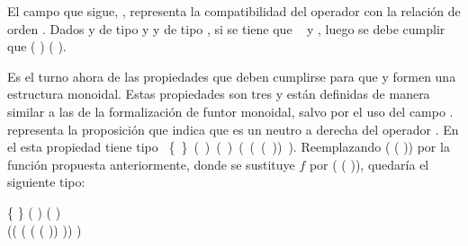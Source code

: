 El campo que sigue, , representa la compatibilidad del operador  con la relación de orden . Dados  y  de tipo  y  y  de tipo , si se tiene que \hbox{  } y   , luego se debe cumplir que ( )  ( ). 

Es el turno ahora de las propiedades que deben cumplirse para que  y  formen una estructura monoidal. Estas propiedades son tres y están definidas de manera similar a las de la formalización de funtor monoidal, salvo por el uso del campo .  representa la proposición que indica que  es un neutro a derecha del operador . En el   esta propiedad tiene tipo \hbox{\AgdaSymbol{$\forall$} \{ \AgdaSymbol{:} \} \AgdaSymbol{$\rightarrow$} ( \AgdaSymbol{:} ) \AgdaSymbol{$\rightarrow$} ( )  ( (\AgdaSymbol{$\lambda$}  \AgdaSymbol{$\rightarrow$} ( )) )}. Reemplazando  (\AgdaSymbol{$\lambda$}  \AgdaSymbol{$\rightarrow$} ( )) por la función propuesta anteriormente, donde se sustituye $f$ por (\AgdaSymbol{$\lambda$}  \AgdaSymbol{$\rightarrow$} ( )), quedaría el siguiente tipo: 
\begin{center}
\AgdaSymbol{$\forall$} \{ \AgdaSymbol{:} \} \AgdaSymbol{$\rightarrow$} ( \AgdaSymbol{:} ) \AgdaSymbol{$\rightarrow$} ( )   \\ ((\AgdaSymbol{$\lambda$}  \AgdaSymbol{$\rightarrow$}  \AgdaField{$\gg=$} (\AgdaSymbol{$\lambda$}  \AgdaSymbol{$\rightarrow$}  (\AgdaSymbol{$\lambda$}  \AgdaSymbol{$\rightarrow$} ( )) )) )
\end{center}

